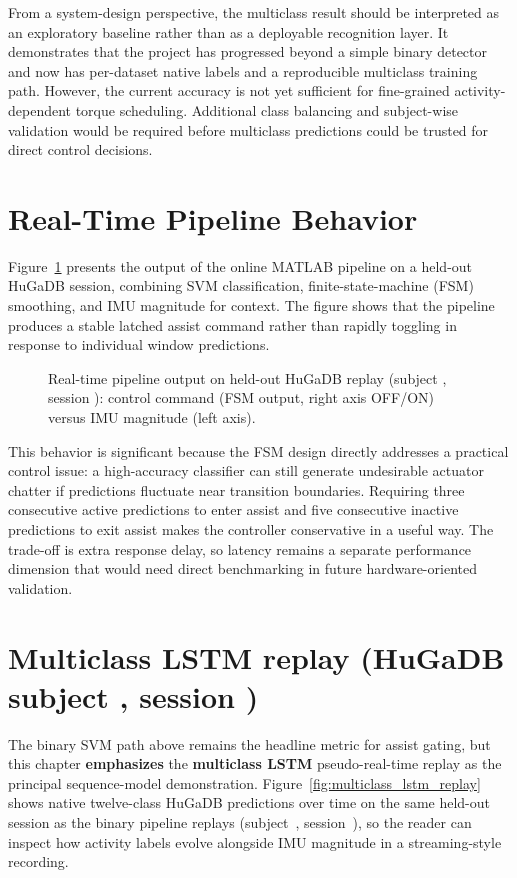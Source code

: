 From a system-design perspective, the multiclass result should be interpreted as an exploratory baseline rather than as a deployable recognition layer. It demonstrates that the project has progressed beyond a simple binary detector and now has per-dataset native labels and a reproducible multiclass training path. However, the current accuracy is not yet sufficient for fine-grained activity-dependent torque scheduling. Additional class balancing and subject-wise validation would be required before multiclass predictions could be trusted for direct control decisions.

\section{Real-Time Pipeline Behavior}
Figure~\ref{fig:pipeline} presents the output of the online MATLAB pipeline on a held-out HuGaDB session, combining SVM classification, finite-state-machine (FSM) smoothing, and IMU magnitude for context. The figure shows that the pipeline produces a stable latched assist command rather than rapidly toggling in response to individual window predictions.

\begin{figure}[htbp]
  \centering
  \caption{Real-time pipeline output on held-out HuGaDB replay (subject \ReplayHuGaDBSubject{}, session \ReplayHuGaDBSession{}): control command (FSM output, right axis OFF/ON) versus IMU magnitude (left axis).}
  \label{fig:pipeline}
\end{figure}

This behavior is significant because the FSM design directly addresses a practical control issue: a high-accuracy classifier can still generate undesirable actuator chatter if predictions fluctuate near transition boundaries. Requiring three consecutive active predictions to enter assist and five consecutive inactive predictions to exit assist makes the controller conservative in a useful way. The trade-off is extra response delay, so latency remains a separate performance dimension that would need direct benchmarking in future hardware-oriented validation.

\section{Multiclass LSTM replay (HuGaDB subject \ReplayHuGaDBSubject{}, session \ReplayHuGaDBSession{})}
\label{sec:multiclass_lstm_replay}
The binary SVM path above remains the headline metric for assist gating, but this chapter \textbf{emphasizes} the \textbf{multiclass LSTM} pseudo-real-time replay as the principal sequence-model demonstration. Figure~\ref{fig:multiclass_lstm_replay} shows native twelve-class HuGaDB predictions over time on the same held-out session as the binary pipeline replays (subject~\ReplayHuGaDBSubject{}, session~\ReplayHuGaDBSession{}), so the reader can inspect how activity labels evolve alongside IMU magnitude in a streaming-style recording.

